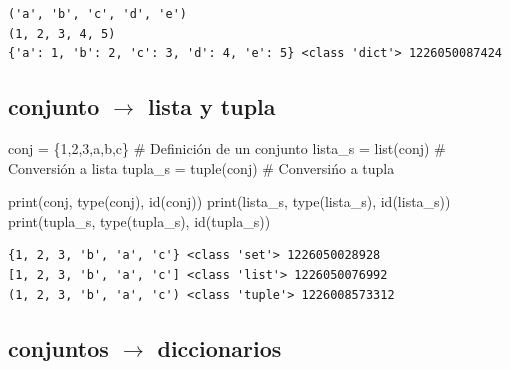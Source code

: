 \documentclass[
  spanish,
  letterpaper,
]{scrbook}
\newenvironment{Shaded}{\begin{snugshade}}{\end{snugshade}}
\newcommand{\BuiltInTok}[1]{\textcolor[rgb]{0.00,0.23,0.31}{#1}}
\newcommand{\CommentTok}[1]{\textcolor[rgb]{0.37,0.37,0.37}{#1}}
\newcommand{\DecValTok}[1]{\textcolor[rgb]{0.68,0.00,0.00}{#1}}
\newcommand{\NormalTok}[1]{\textcolor[rgb]{0.00,0.23,0.31}{#1}}
\newcommand{\OperatorTok}[1]{\textcolor[rgb]{0.37,0.37,0.37}{#1}}
\newcommand{\StringTok}[1]{\textcolor[rgb]{0.13,0.47,0.30}{#1}}
\theoremstyle{definition}
\theoremstyle{remark}
\begin{document}
\begin{verbatim}
('a', 'b', 'c', 'd', 'e')
(1, 2, 3, 4, 5)
{'a': 1, 'b': 2, 'c': 3, 'd': 4, 'e': 5} <class 'dict'> 1226050087424
\end{verbatim}

\subsection{\texorpdfstring{conjunto \(\to\) lista y
tupla}{conjunto \textbackslash to lista y tupla}}\label{conjunto-to-lista-y-tupla}

\begin{Shaded}
\begin{Highlighting}[]
\NormalTok{conj }\OperatorTok{=}\NormalTok{ \{}\DecValTok{1}\NormalTok{,}\DecValTok{2}\NormalTok{,}\DecValTok{3}\NormalTok{,}\StringTok{\textquotesingle{}a\textquotesingle{}}\NormalTok{,}\StringTok{\textquotesingle{}b\textquotesingle{}}\NormalTok{,}\StringTok{\textquotesingle{}c\textquotesingle{}}\NormalTok{\} }\CommentTok{\# Definición de un conjunto}
\NormalTok{lista\_s }\OperatorTok{=} \BuiltInTok{list}\NormalTok{(conj)       }\CommentTok{\# Conversión a lista}
\NormalTok{tupla\_s }\OperatorTok{=} \BuiltInTok{tuple}\NormalTok{(conj)      }\CommentTok{\# Conversińo a tupla}

\BuiltInTok{print}\NormalTok{(conj, }\BuiltInTok{type}\NormalTok{(conj), }\BuiltInTok{id}\NormalTok{(conj))}
\BuiltInTok{print}\NormalTok{(lista\_s, }\BuiltInTok{type}\NormalTok{(lista\_s), }\BuiltInTok{id}\NormalTok{(lista\_s))}
\BuiltInTok{print}\NormalTok{(tupla\_s, }\BuiltInTok{type}\NormalTok{(tupla\_s), }\BuiltInTok{id}\NormalTok{(tupla\_s))}
\end{Highlighting}
\end{Shaded}

\begin{verbatim}
{1, 2, 3, 'b', 'a', 'c'} <class 'set'> 1226050028928
[1, 2, 3, 'b', 'a', 'c'] <class 'list'> 1226050076992
(1, 2, 3, 'b', 'a', 'c') <class 'tuple'> 1226008573312
\end{verbatim}

\subsection{\texorpdfstring{conjuntos \(\to\)
diccionarios}{conjuntos \textbackslash to diccionarios}}\label{conjuntos-to-diccionarios}
\end{document}
